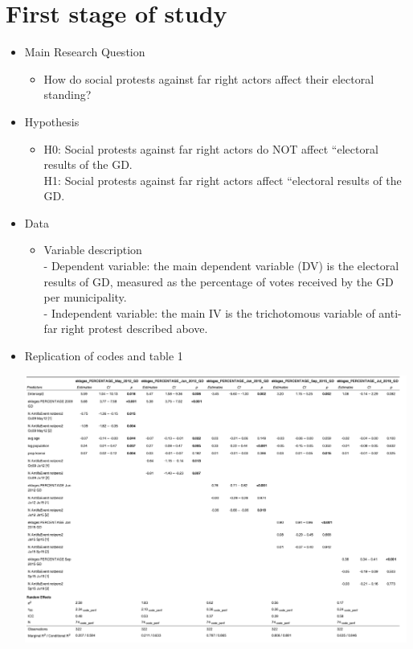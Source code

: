 \documentclass[12pt,letterpaper]{article}
\begin{document}
\section*{First stage of study}
\vspace{.25cm}
\begin{itemize}
	\item
	Main Research Question
	\begin{itemize}
		\item How do social protests against far right actors affect their electoral standing?
	\end{itemize}
	\item
	Hypothesis
	\begin{itemize}
		\item H0: Social protests against far right actors do NOT affect “electoral results of the GD.\\
		H1: Social protests against far right actors affect “electoral results of the GD.
	\end{itemize}
	\item
	Data
	\begin{itemize}
		\item 
		Variable description\\
		- Dependent variable: the main dependent variable (DV) is the electoral results of GD, measured as the percentage of votes received by the GD per municipality.\\
		- Independent variable: the main IV is the trichotomous variable of anti-far right protest described above.	
	\end{itemize}
	\item 
	Replication of codes and table 1
	\begin{itemize}
	
	\includegraphics[width=0.99\textwidth]{Table_1.png}

\end{itemize}
\end{itemize}
\end{document}
